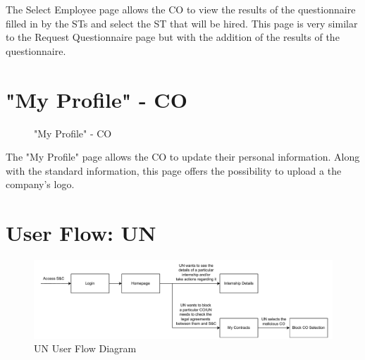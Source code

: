 \par The Select Employee page allows the CO to view the results of the questionnaire filled in by the STs and select
the ST that will be hired. This page is very similar to the Request Questionnaire page but with the addition of the
results of the questionnaire.

\section{"My Profile" - CO}
\label{subsec:profile-co}%

\begin{figure}[H]
    \centering
    \caption{"My Profile" - CO}
    \label{fig:profile-co}
\end{figure}

\par The "My Profile" page allows the CO to update their personal information. Along with the standard information,
this page offers the possibility to upload a the company's logo.

\section{User Flow: UN}
\label{sec:user-flow-un}%

\begin{figure}[H]
    \centering
    \includegraphics[width=1.0\textwidth]{Images/GUI/UN/Diagram.pdf}
    \caption{UN User Flow Diagram}
    \label{fig:un-user-flow-diagram}
\end{figure}

